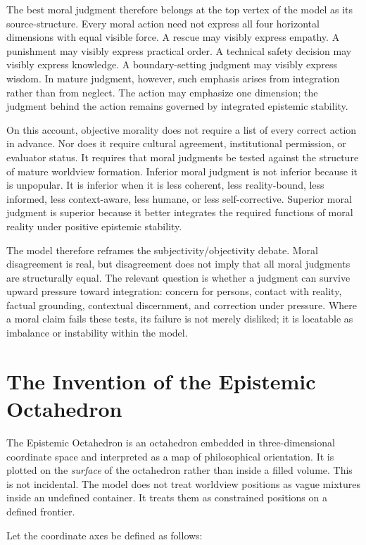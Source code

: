\documentclass[11pt]{article}
\begin{document}
The best moral judgment therefore belongs at the top vertex of the model as its source-structure. Every moral action need not express all four horizontal dimensions with equal visible force. A rescue may visibly express empathy. A punishment may visibly express practical order. A technical safety decision may visibly express knowledge. A boundary-setting judgment may visibly express wisdom. In mature judgment, however, such emphasis arises from integration rather than from neglect. The action may emphasize one dimension; the judgment behind the action remains governed by integrated epistemic stability.

On this account, objective morality does not require a list of every correct action in advance. Nor does it require cultural agreement, institutional permission, or evaluator status. It requires that moral judgments be tested against the structure of mature worldview formation. Inferior moral judgment is not inferior because it is unpopular. It is inferior when it is less coherent, less reality-bound, less informed, less context-aware, less humane, or less self-corrective. Superior moral judgment is superior because it better integrates the required functions of moral reality under positive epistemic stability.

The model therefore reframes the subjectivity/objectivity debate. Moral disagreement is real, but disagreement does not imply that all moral judgments are structurally equal. The relevant question is whether a judgment can survive upward pressure toward integration: concern for persons, contact with reality, factual grounding, contextual discernment, and correction under pressure. Where a moral claim fails these tests, its failure is not merely disliked; it is locatable as imbalance or instability within the model.


\section{The Invention of the Epistemic Octahedron}

The Epistemic Octahedron is an octahedron embedded in three-dimensional coordinate space and interpreted as a map of philosophical orientation. It is plotted on the \emph{surface} of the octahedron rather than inside a filled volume. This is not incidental. The model does not treat worldview positions as vague mixtures inside an undefined container. It treats them as constrained positions on a defined frontier.

Let the coordinate axes be defined as follows:
\end{document}
